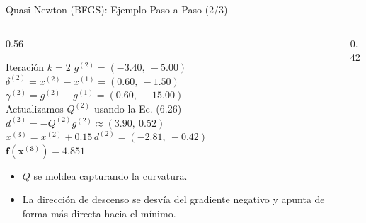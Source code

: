 \begin{frame}{Quasi-Newton (BFGS): Ejemplo Paso a Paso (2/3)}
    \begin{columns}[T]
        \begin{column}{0.56\textwidth}
            \begin{block}{Iteración $k=2$}
                \scriptsize
                $g^{(2)}=(-3.40,\ -5.00)$\\[2pt]
                $\delta^{(2)}=x^{(2)}-x^{(1)}=(0.60,\ -1.50)$\\[2pt]
                $\gamma^{(2)}=g^{(2)}-g^{(1)}=(0.60,\ -15.00)$\\[2pt]
                Actualizamos $Q^{(2)}$ usando la Ec. (6.26)\\[2pt]
                $d^{(2)}=-Q^{(2)}g^{(2)} \approx (3.90,\ 0.52)$\\[2pt]
                $x^{(3)}=x^{(2)}+0.15\, d^{(2)} = (-2.81,\ -0.42)$\\[2pt]
                $\mathbf{f(x^{(3)})=4.851}$
            \end{block}
            \small
            \begin{itemize}
                \item $Q$ se moldea capturando la curvatura.
                \item La dirección de descenso se desvía del gradiente negativo y apunta de forma más directa hacia el mínimo.
            \end{itemize}
        \end{column}
        \begin{column}{0.42\textwidth}
            \centering
        \end{column}
    \end{columns}
\end{frame}

